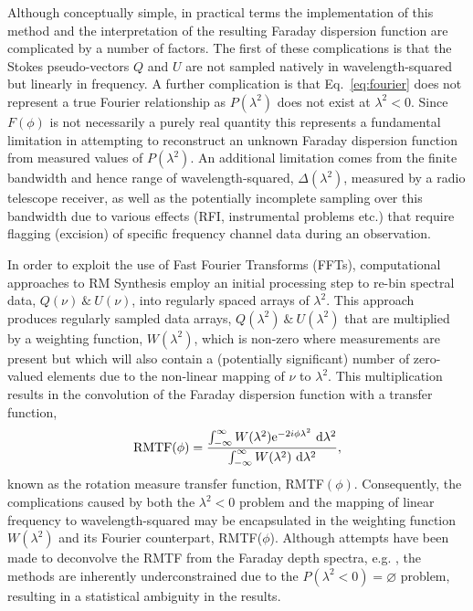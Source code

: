 \documentclass[fleqn,usenatbib]{mnras}
\begin{document}
Although conceptually simple, in practical terms the implementation of this method and the interpretation of the resulting Faraday dispersion function are complicated by a number of factors. The first of these complications is that the Stokes pseudo-vectors $Q$ and $U$ are not sampled natively in wavelength-squared but linearly in frequency. A further complication is that Eq.~\ref{eq:fourier} does not represent a true Fourier relationship as $P(\lambda^2)$ does not exist at $\lambda^2 < 0$. Since $F(\phi)$ is not necessarily a purely real quantity this represents a fundamental limitation in attempting to reconstruct an unknown Faraday dispersion function from measured values of $P(\lambda^2)$. An additional limitation comes from the finite bandwidth and hence range of wavelength-squared, $\Delta (\lambda^2)$, measured by a radio telescope receiver, as well as the potentially incomplete sampling over this bandwidth due to various effects (RFI, instrumental problems etc.) that require flagging (excision) of specific frequency channel data during an observation.

In order to exploit the use of Fast Fourier Transforms (FFTs), computational approaches to RM Synthesis employ an initial processing step to re-bin spectral data, $Q(\nu)~\&~U(\nu)$, into regularly spaced arrays of $\lambda^2$. This approach produces regularly sampled data arrays, $Q(\lambda^2)~\&~U(\lambda^2)$ that are multiplied by a weighting function, $W(\lambda^2)$, which is non-zero where measurements are present but which will also contain a (potentially significant) number of zero-valued elements due to the non-linear mapping of $\nu$ to $\lambda^2$. This  multiplication results in the convolution of the Faraday dispersion function with a transfer function,
%
\begin{equation}
\label{eq:rmtf}
{\rm RMTF}(\phi) = \frac{\int_{-\infty}^{\infty} { W(\lambda^2){\rm e}^{-2i\phi\lambda^2}~{\rm d}\lambda^2 }}{\int_{-\infty}^{\infty} { W(\lambda^2)~{\rm d}\lambda^2 }},
\end{equation}
%
known as the rotation measure transfer function, RMTF$(\phi)$. Consequently, the complications caused by both the $\lambda^2 < 0$ problem and the mapping of linear frequency to wavelength-squared may be encapsulated in the weighting function $W(\lambda^2)$ and its Fourier counterpart, RMTF($\phi$). Although attempts have been made to deconvolve the RMTF from the Faraday depth spectra, e.g. \cite{2009IAUS..259..591H}, the  methods are inherently underconstrained due to the $P(\lambda^2<0) = \varnothing$ problem, resulting in a statistical ambiguity in the results.
\end{document}
